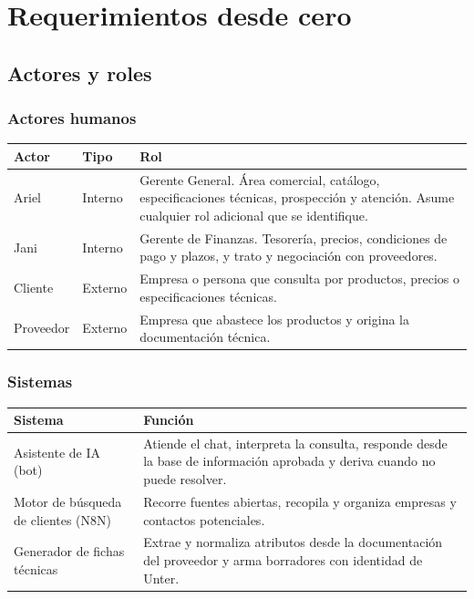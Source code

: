 \documentclass{article}
\begin{document}
\section{Requerimientos desde cero}

\subsection{Actores y roles}

\subsubsection*{Actores humanos}

\begin{table}[H]
\centering
\begin{tabularx}{\textwidth}{llL}
\toprule
\textbf{Actor} & \textbf{Tipo} & \textbf{Rol} \\
\midrule
Ariel & Interno & Gerente General. Área comercial, catálogo, especificaciones técnicas, prospección y atención. Asume cualquier rol adicional que se identifique. \\
Jani & Interno & Gerente de Finanzas. Tesorería, precios, condiciones de pago y plazos, y trato y negociación con proveedores. \\
Cliente & Externo & Empresa o persona que consulta por productos, precios o especificaciones técnicas. \\
Proveedor & Externo & Empresa que abastece los productos y origina la documentación técnica. \\
\bottomrule
\end{tabularx}
\end{table}

\subsubsection*{Sistemas}

\begin{table}[H]
\centering
\begin{tabularx}{\textwidth}{lL}
\toprule
\textbf{Sistema} & \textbf{Función} \\
\midrule
Asistente de IA (bot) & Atiende el chat, interpreta la consulta, responde desde la base de información aprobada y deriva cuando no puede resolver. \\
Motor de búsqueda de clientes (N8N) & Recorre fuentes abiertas, recopila y organiza empresas y contactos potenciales. \\
Generador de fichas técnicas & Extrae y normaliza atributos desde la documentación del proveedor y arma borradores con identidad de Unter. \\
\bottomrule
\end{tabularx}
\end{table}
\end{document}
